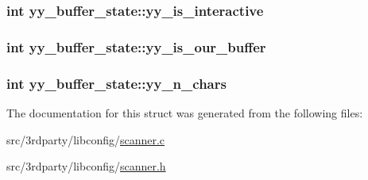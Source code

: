 \label{structyy__buffer__state_a4360acfb226a1fc240ab2be17dd6beda}
\hypertarget{structyy__buffer__state_abf5c70eea75581b58c0ee7bd31b14490}{
\subsubsection[{yy\_\-is\_\-interactive}]{\setlength{\rightskip}{0pt plus 5cm}int {\bf yy\_\-buffer\_\-state::yy\_\-is\_\-interactive}}}
\label{structyy__buffer__state_abf5c70eea75581b58c0ee7bd31b14490}
\hypertarget{structyy__buffer__state_a80ce2431c70dc4f89ced487f18449465}{
\subsubsection[{yy\_\-is\_\-our\_\-buffer}]{\setlength{\rightskip}{0pt plus 5cm}int {\bf yy\_\-buffer\_\-state::yy\_\-is\_\-our\_\-buffer}}}
\label{structyy__buffer__state_a80ce2431c70dc4f89ced487f18449465}
\hypertarget{structyy__buffer__state_a06406208824817acfec2183b79080945}{
\subsubsection[{yy\_\-n\_\-chars}]{\setlength{\rightskip}{0pt plus 5cm}int {\bf yy\_\-buffer\_\-state::yy\_\-n\_\-chars}}}
\label{structyy__buffer__state_a06406208824817acfec2183b79080945}


The documentation for this struct was generated from the following files:\begin{DoxyCompactItemize}
\item 
src/3rdparty/libconfig/\hyperlink{scanner_8c}{scanner.c}\item 
src/3rdparty/libconfig/\hyperlink{scanner_8h}{scanner.h}\end{DoxyCompactItemize}
